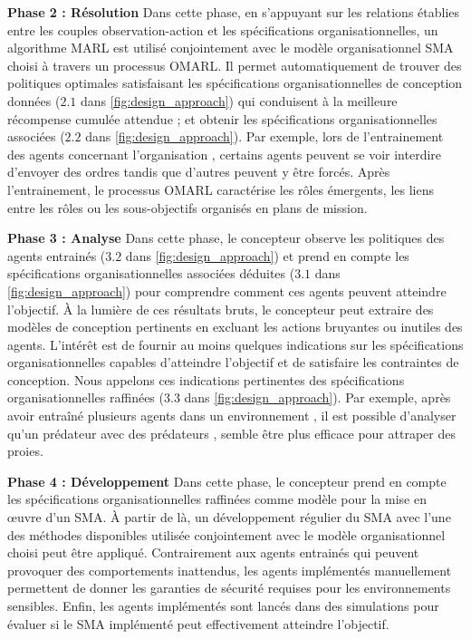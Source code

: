 \documentclass[contribution]{jfsma}
\newcounter{relation}
\begin{document}
\textbf{Phase 2 : Résolution} \quad Dans cette phase, en s'appuyant sur les relations établies entre les couples observation-action et les spécifications organisationnelles, un algorithme MARL est utilisé conjointement avec le modèle organisationnel SMA choisi à travers un processus OMARL. Il permet automatiquement de trouver des politiques optimales satisfaisant les spécifications organisationnelles de conception données ($2.1$ dans \autoref{fig:design_approach}) qui conduisent à la meilleure récompense cumulée attendue ; et obtenir les spécifications organisationnelles associées ($2.2$ dans \autoref{fig:design_approach}). Par exemple, lors de l'entrainement des agents concernant l'organisation , certains agents peuvent se voir interdire d'envoyer des ordres tandis que d'autres peuvent y être forcés. Après l'entrainement, le processus OMARL caractérise les rôles émergents, les liens entre les rôles ou les sous-objectifs organisés en plans de mission.

\textbf{Phase 3 : Analyse} \quad Dans cette phase, le concepteur observe les politiques des agents entrainés ($3.2$ dans \autoref{fig:design_approach}) et prend en compte les spécifications organisationnelles associées déduites ($3.1$ dans \autoref{fig:design_approach}) pour comprendre comment ces agents peuvent atteindre l'objectif. À la lumière de ces résultats bruts, le concepteur peut extraire des modèles de conception pertinents en excluant les actions bruyantes ou inutiles des agents. L'intérêt est de fournir au moins quelques indications sur les spécifications organisationnelles capables d'atteindre l'objectif et de satisfaire les contraintes de conception. Nous appelons ces indications pertinentes des spécifications organisationnelles raffinées ($3.3$ dans \autoref{fig:design_approach}). Par exemple, après avoir entraîné plusieurs agents dans un environnement , il est possible d'analyser qu'un prédateur  avec des prédateurs , semble être plus efficace pour attraper des proies.

\textbf{Phase 4 : Développement} \quad Dans cette phase, le concepteur prend en compte les spécifications organisationnelles raffinées comme modèle pour la mise en œuvre d'un SMA. À partir de là, un développement régulier du SMA avec l'une des méthodes disponibles utilisée conjointement avec le modèle organisationnel choisi peut être appliqué. Contrairement aux agents entrainés qui peuvent provoquer des comportements inattendus, les agents implémentés manuellement permettent de donner les garanties de sécurité requises pour les environnements sensibles. Enfin, les agents implémentés sont lancés dans des simulations pour évaluer si le SMA implémenté peut effectivement atteindre l'objectif.
\end{document}
